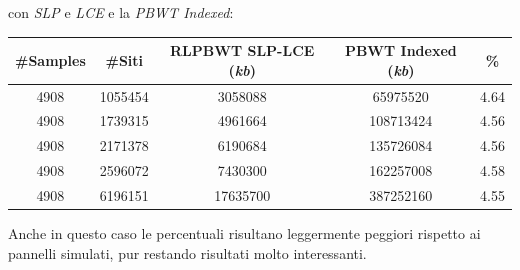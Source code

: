 con \textit{SLP} e \textit{LCE} e la \textit{PBWT Indexed}:
\begin{table}[H]
  \centering
  \footnotesize
  \begin{tabular}{c|c|c|c|c}
    \textbf{\#Samples} & \textbf{\#Siti}
    & \textbf{RLPBWT SLP-LCE (\textit{kb})}
    & \textbf{PBWT Indexed (\textit{kb})} & \textbf{\%}\\
    \hline
    4908 & 1055454 & 3058088 & 65975520 & 4.64\\
    4908 & 1739315 & 4961664 & 108713424 & 4.56\\
    4908 & 2171378 & 6190684 & 135726084 & 4.56\\
    4908 & 2596072 & 7430300 & 162257008 & 4.58\\
    4908 & 6196151 & 17635700 & 387252160 & 4.55
  \end{tabular}
\end{table}
Anche in questo caso le percentuali risultano leggermente peggiori rispetto ai
pannelli simulati, pur restando risultati molto interessanti.

